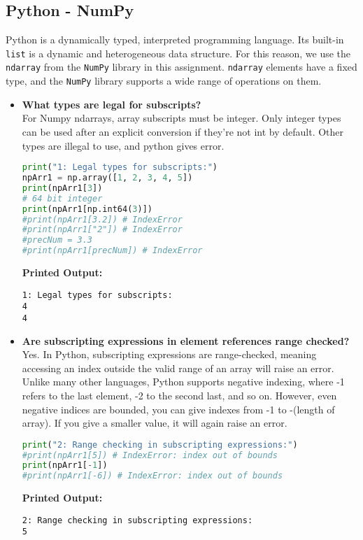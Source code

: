 \documentclass{article}
\begin{document}
\subsection{Python - NumPy}

Python is a dynamically typed, interpreted programming language. Its built-in \texttt{list} is a dynamic and heterogeneous data structure. For this reason, we use the \texttt{ndarray} from the \texttt{NumPy} library in this assignment. \texttt{ndarray} elements have a fixed type, and the \texttt{NumPy} library supports a wide range of operations on them.

\begin{itemize}
\item \textbf{What types are legal for subscripts?} \\
For Numpy ndarrays, array subscripts must be integer. Only integer types can be used after an explicit conversion if they’re not int by default. Other types are illegal to use, and python gives error. 
\begin{lstlisting}[language=Python]
print("1: Legal types for subscripts:")
npArr1 = np.array([1, 2, 3, 4, 5])
print(npArr1[3])
# 64 bit integer
print(npArr1[np.int64(3)])
#print(npArr1[3.2]) # IndexError
#print(npArr1["2"]) # IndexError
#precNum = 3.3
#print(npArr1[precNum]) # IndexError
\end{lstlisting}
\textbf{Printed Output:}
\begin{verbatim}
1: Legal types for subscripts:
4
4
\end{verbatim}


\item \textbf{Are subscripting expressions in element references range checked?} \\
Yes. In Python, subscripting expressions are range-checked, meaning accessing an index outside the valid range of an array will raise an error. Unlike many other languages, Python supports negative indexing, where -1 refers to the last element, -2 to the second last, and so on. However, even negative indices are bounded, you can give indexes from -1 to -(length of array). If you give a smaller value, it will again raise an error. 

\begin{lstlisting}[language=Python]
print("2: Range checking in subscripting expressions:")
#print(npArr1[5]) # IndexError: index out of bounds
print(npArr1[-1])
#print(npArr1[-6]) # IndexError: index out of bounds
\end{lstlisting}
\textbf{Printed Output:}
\begin{verbatim}
2: Range checking in subscripting expressions:
5
\end{verbatim}



\end{itemize}
\end{document}
